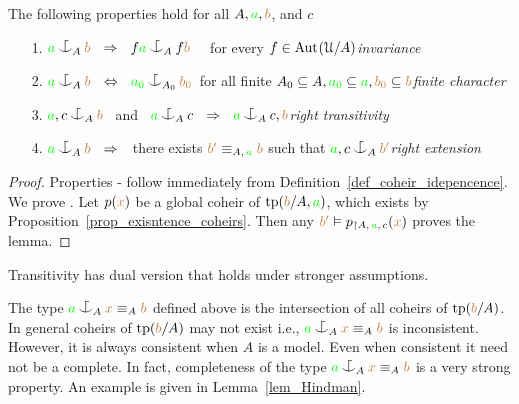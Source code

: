 \documentclass[creche.tex]{subfiles}
\begin{document}
\begin{lemma}\label{lem_coheir_independence}
The following properties hold for all $A,{\color{green} a},{\color{brown} b}$, and $c$
\begin{itemize}
\item[1.] ${\gr a}\nonforkc_A{\mr b}\ \ \IMP\ \ f{\gr a}\nonforkc_Af{\mr b}$ \ \ for every $f\in\textrm{Aut\kern.15ex}(\EuScript U/A)$\hfill \textit{invariance}
\item[2.] ${\gr a}\nonforkc_A{\mr b}\ \ \IFF\ \ {\gr a_0}\nonforkc_{A_0}{\mr b_0}$\ for all finite $A_0\subseteq A, {\color{green} a_0}\subseteq{\color{green}a}, {\color{brown} b_0}\subseteq{\color{brown}b}$\hfill \textit{finite character}
\item[3.] ${\gr a},c\nonforkc_{A}{\mr b}$ \ and \ ${\gr a}\nonforkc_Ac\ \ \IMP\ \ {\gr a}\nonforkc_Ac,{\mr b}$\hfill \textit{right transitivity}
\item[4.] ${\gr a}\nonforkc_A{\mr b}\ \ \IMP\ \ $ there exists ${\color{brown} b'}\equiv_{A,\,{\color{green} a}}{\color{brown} b}$ such that ${\gr a},c\nonforkc_A{\mr b'}$\hfill \textit{right extension}

\end{itemize}
\end{lemma}
\begin{proof}
Properties - follow immediately from Definition~\ref{def_coheir_idepencence}.
We prove .
Let $p({\color{brown} x})$ be a global coheir of ${\rm tp}({\color{brown} b}/A,{\color{green} a})$, which exists by Proposition~\ref{prop_exisntence_coheirs}.
Then any ${\color{brown} b'}\vDash p_{\restriction A,\,{\color{green} a},\,c}({\color{brown} x})$ proves the lemma.
\end{proof}


Transitivity has dual version that holds under stronger assumptions.


The type ${\gr a}\nonforkc_A{\mr x}\equiv_A{\mr b}$ defined above is the intersection of all coheirs of ${\rm tp}({\color{brown} b}/A)$.
In general coheirs of ${\rm tp}({\color{brown} b}/A)$ may not exist i.e.,  ${\gr a}\nonforkc_A{\mr x}\equiv_A{\mr b}$ is inconsistent.
However, it is always consistent when $A$ is a model.
Even when consistent it need not be a complete.
In fact, completeness  of the type ${\gr a}\nonforkc_A{\mr x}\equiv_A{\mr b}$ is a very strong property.
An example is given in Lemma~\ref{lem_Hindman}.
\end{document}
